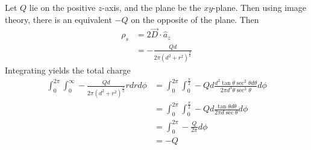 \documentclass[answers]{exam}
\begin{document}
\begin{questions}
\begin{solution}
    Let $Q$ lie on the positive $z$-axis, and the plane be the $xy$-plane. Then using image theory, there is an equivalent $-Q$ on the opposite of the plane. Then
    \begin{align*}
        \rho_s &= 2\vec{D} \cdot \hat{a}_z \\
               &= -\frac{Qd}{2\pi(d^2+r^2)^{\frac{3}{2}}}
    \end{align*}
    Integrating yields the total charge
    \begin{align*}
        \int_0^{2\pi} \int_0^\infty -\frac{Qd}{2\pi(d^2+r^2)^{\frac{3}{2}}} rdrd\phi &= \int_0^{2\pi} \int_0^{\frac{\pi}{2}} -Qd\frac{d^2\tan\theta\sec^2\theta d\theta}{2\pi d^3\theta\sec^3\theta} d\phi \\
                                                                                     &= \int_0^{2\pi} \int_0^{\frac{\pi}{2}} -Qd \frac{\tan\theta d\theta}{2\pi d\sec\theta} d\phi \\
                                                                                     &= \int_0^{2\pi} -\frac{Q}{2\pi} d\phi \\
                                                                                     &= -Q
    \end{align*}
\end{solution}

\end{questions}
\end{document}
